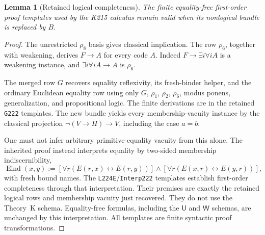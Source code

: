 \documentclass[11pt]{article}
\newcommand{\ThU}{\mathsf U}
\newcommand{\ThW}{\mathsf W}
\newtheorem{lemma}[theorem]{Lemma}
\theoremstyle{definition}\newtheorem{definition}[theorem]{Definition}
\begin{document}
\begin{lemma}[Retained logical completeness]\label{lem:logic}
The finite equality-free first-order proof templates used by the K215
calculus remain valid when its nonlogical bundle is replaced by $B$.
\end{lemma}
\begin{proof}
The unrestricted $\rho_8$ basis gives classical implication. The row
$\rho_6$, together with weakening, derives $F\to A$ for every code $A$.
Indeed $F\to\exists i\forall i A$ is a weakening instance, and
$\exists i\forall i A\to A$ is $\rho_6$.

The merged row $G$ recovers equality reflexivity, its fresh-binder helper,
and the ordinary Euclidean equality row using only $G$, $\rho_1$,
$\rho_2$, $\rho_6$, modus ponens, generalization, and propositional
logic. The finite derivations are in the retained \texttt{G222} templates.
The new bundle yields every membership-vacuity instance by the classical
projection $\neg(V\to H)\to V$, including the case $a=b$.

One must not infer arbitrary primitive-equality vacuity from this alone.
The inherited proof instead interprets equality by two-sided membership
indiscernibility,
\[
 \operatorname{Eind}(x,y):=
 [\forall r(E(r,x)\leftrightarrow E(r,y))]\land
 [\forall r(E(x,r)\leftrightarrow E(y,r))],
\]
with fresh bound names. The \texttt{L224E}/\texttt{Interp222}
templates establish first-order completeness through that interpretation.
Their premises are exactly the retained logical rows and membership
vacuity just recovered. They do not use the Theory~K schema. Equality-free
formulas, including the $\ThU$ and $\ThW$ schemas, are unchanged by this
interpretation. All templates are finite syntactic proof transformations.
\end{proof}
\end{document}
